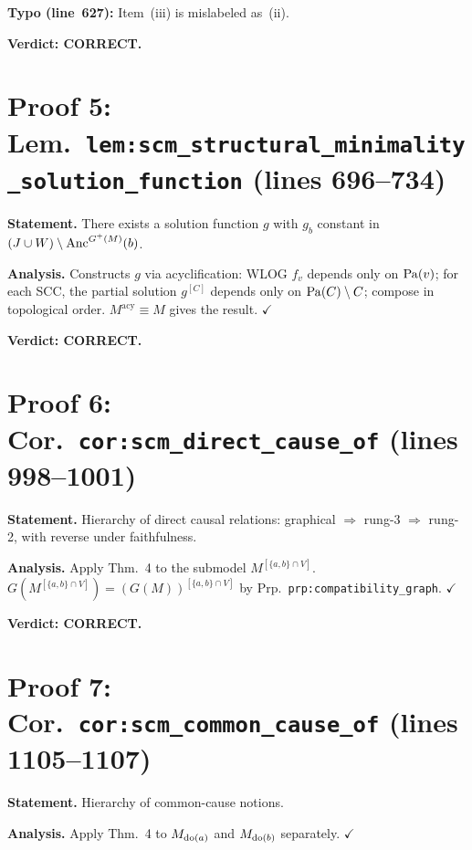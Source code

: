 \documentclass{article}
\begin{document}
\textbf{Typo (line~627):} Item~(iii) is mislabeled as~(ii).

\textbf{Verdict: CORRECT.}

\section{Proof 5: Lem.\ \texttt{lem:scm\_structural\_minimality\_solution\_function}
(lines 696--734)}

\textbf{Statement.} There exists a solution function $g$ with $g_b$ constant in
$(J\cup W)\setminus\mathrm{Anc}^{G^+(M)}(b)$.

\textbf{Analysis.}
Constructs $g$ via acyclification: WLOG $f_v$ depends only on $\mathrm{Pa}(v)$;
for each SCC, the partial solution $g^{[C]}$ depends only on $\mathrm{Pa}(C)\setminus C$;
compose in topological order.  $M^{\mathrm{acy}}\equiv M$ gives the result.
$\checkmark$

\textbf{Verdict: CORRECT.}

\section{Proof 6: Cor.\ \texttt{cor:scm\_direct\_cause\_of} (lines 998--1001)}

\textbf{Statement.} Hierarchy of direct causal relations:
graphical $\Rightarrow$ rung-3 $\Rightarrow$ rung-2, with reverse under
faithfulness.

\textbf{Analysis.}
Apply Thm.~4 to the submodel $M^{[\{a,b\}\cap V]}$.
$G(M^{[\{a,b\}\cap V]})=(G(M))^{[\{a,b\}\cap V]}$ by
Prp.\ \texttt{prp:compatibility\_graph}.  $\checkmark$

\textbf{Verdict: CORRECT.}

\section{Proof 7: Cor.\ \texttt{cor:scm\_common\_cause\_of} (lines 1105--1107)}

\textbf{Statement.} Hierarchy of common-cause notions.

\textbf{Analysis.}
Apply Thm.~4 to $M_{\operatorname{do}(a)}$ and $M_{\operatorname{do}(b)}$ separately.  $\checkmark$
\end{document}
